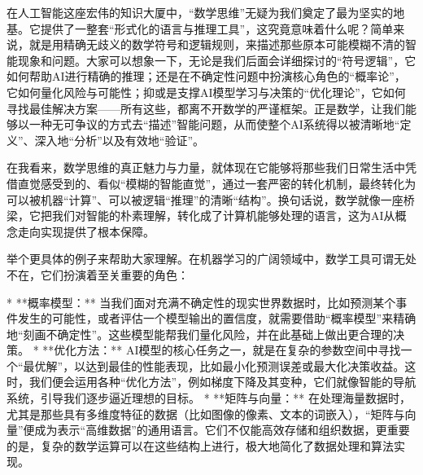 

在人工智能这座宏伟的知识大厦中，“数学思维”无疑为我们奠定了最为坚实的地基。它提供了一整套“形式化的语言与推理工具”，这究竟意味着什么呢？简单来说，就是用精确无歧义的数学符号和逻辑规则，来描述那些原本可能模糊不清的智能现象和问题。大家可以想象一下，无论是我们后面会详细探讨的“符号逻辑”，它如何帮助AI进行精确的推理；还是在不确定性问题中扮演核心角色的“概率论”，它如何量化风险与可能性；抑或是支撑AI模型学习与决策的“优化理论”，它如何寻找最佳解决方案——所有这些，都离不开数学的严谨框架。正是数学，让我们能够以一种无可争议的方式去“描述”智能问题，从而使整个AI系统得以被清晰地“定义”、深入地“分析”以及有效地“验证”。

在我看来，数学思维的真正魅力与力量，就体现在它能够将那些我们日常生活中凭借直觉感受到的、看似“模糊的智能直觉”，通过一套严密的转化机制，最终转化为可以被机器“计算”、可以被逻辑“推理”的清晰“结构”。换句话说，数学就像一座桥梁，它把我们对智能的朴素理解，转化成了计算机能够处理的语言，这为AI从概念走向实现提供了根本保障。



举个更具体的例子来帮助大家理解。在机器学习的广阔领域中，数学工具可谓无处不在，它们扮演着至关重要的角色：

*   **概率模型：** 当我们面对充满不确定性的现实世界数据时，比如预测某个事件发生的可能性，或者评估一个模型输出的置信度，就需要借助“概率模型”来精确地“刻画不确定性”。这些模型能帮我们量化风险，并在此基础上做出更合理的决策。
*   **优化方法：** AI模型的核心任务之一，就是在复杂的参数空间中寻找一个“最优解”，以达到最佳的性能表现，比如最小化预测误差或最大化决策收益。这时，我们便会运用各种“优化方法”，例如梯度下降及其变种，它们就像智能的导航系统，引导我们逐步逼近理想的目标。
*   **矩阵与向量：** 在处理海量数据时，尤其是那些具有多维度特征的数据（比如图像的像素、文本的词嵌入），“矩阵与向量”便成为表示“高维数据”的通用语言。它们不仅能高效存储和组织数据，更重要的是，复杂的数学运算可以在这些结构上进行，极大地简化了数据处理和算法实现。

